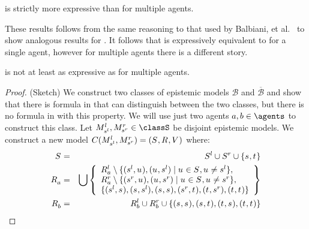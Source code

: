 \begin{theorem}
\logicPapalS{} is strictly more expressive than \logicPalS{} for multiple agents.
\end{theorem}

These results follows from the same reasoning to that used by Balbiani, et al.~\cite{balbiani:2008} to show analogous results for \logicApalS{}.
It follows that \logicPapalS{} is expressively equivalent to \logicApalS{} for a single agent, however for multiple agents there is a different story.

\begin{theorem}\label{expressivity-s5}
\logicPapalS{} is not at least as expressive as \logicApalS{} for multiple agents.
\end{theorem}

\begin{proof}{(Sketch)} 
We construct two classes of epistemic models $\mathcal{B}$ and $\overline{\mathcal{B}}$ and show that there is formula in \langApal{} that can distinguish between the two classes, but there is no formula in \langPapal{} with this property. 
We will use just two agents $\agentA, \agentB \in \agents$ to construct this class.
Let $\kPModel[l]{\kStateS[l]}, \kPModel[r]{\kStateS[r]} \in \classS$ be disjoint epistemic models. 
We construct a new model $C(\kPModel[l]{\kStateS[l]},\kPModel[r]{\kStateS[r]}) = \kModelTuple$ where:
\begin{eqnarray*}
    \kStates &=& \kStates[l] \cup \kStates[r] \cup \{\kStateS, \kStateT\}\\
    \kAccessibility{\agentA} &=& \bigcup \left\{ \begin{array}{l}
            \kAccessibility[l]{\agentA} \setminus \{(\kStateS[l], \kStateU), (\kStateU, \kStateS[l]) \mid \kStateU \in \kStates, \kStateU \neq \kStateS[l]\},\\
            \kAccessibility[r]{\agentA} \setminus \{(\kStateS[r], \kStateU), (\kStateU, \kStateS[r]) \mid \kStateU \in \kStates, \kStateU \neq \kStateS[r]\},\\
            \{(\kStateS[l], \kStateS), (\kStateS, \kStateS[l]), (\kStateS, \kStateS),
              (\kStateS[r], \kStateT), (\kStateT, \kStateS[r]), (\kStateT, \kStateT)\}
        \end{array}\right\}\\
    \kAccessibility{\agentB} &=& \kAccessibility[l]{\agentB} \cup \kAccessibility[r]{\agentB} \cup \{(\kStateS, \kStateS), (\kStateS, \kStateT), (\kStateT, \kStateS), (\kStateT, \kStateT)\}\\

\end{eqnarray*}
\end{proof}
